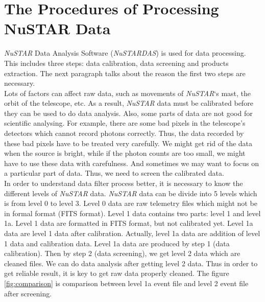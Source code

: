 \documentclass[12pt]{report}
\begin{document}
        \section{The Procedures of Processing NuSTAR Data}
            \textit{NuSTAR} Data Analysis Software (\textit{NuSTARDAS}) is used for data processing. This includes 
            three steps:
            data calibration, data screening and products extraction. The next paragraph talks about the reason the 
            first two steps are necessary. \\
            \indent 
            Lots of factors can affect raw data, such as movements of \textit{NuSTAR}‘s mast, the orbit of the 
            telescope, 
            etc. As a result, \textit{NuSTAR} data must be calibrated before they can be used to do data analysis. 
            Also, some parts 
            of data are not good for scientific analysing. For example, there are some bad pixels in the telescope's 
            detectors which cannot record photons correctly. Thus, the data recorded by these bad pixels have to be
            treated very carefully. We might get rid of the data when the source is bright, while if the photon counts
            are too small, we might have to use these data with carefulness. And sometimes we may want to focus on a 
            particular part of data. Thus, we need to screen the calibrated data. \\
            \indent 
            In order to understand data filter process better, it is necessary to know the different levels of 
            \textit{NuSTAR} data. 
            \textit{NuSTAR} data can be divide into 5 levels which is from level 0 to level 3. Level 0 data are raw 
            telemetry files
            which might not be in formal format (FITS format). Level 1 data contains two parts: level 1 and level 
            1a. Level 1
            data are formatted in FITS format, but not calibrated yet. Level 1a data are level 1 data after 
            calibration. 
            Actually, level 1a data are addition of level 1 data and calibration data. Level 1a data are produced by 
            step 1 
            (data calibration). Then by step 2 (data screening), we get level 2 data which are cleaned files. We 
            can do data
            analysis after getting level 2 data. Thus in order to get reliable result, it is key to get raw data 
            properly 
            cleaned. The figure \ref{fig:comparison} is comparison between level 1a event file and level 2 event file 
            after screening.  
\end{document}

